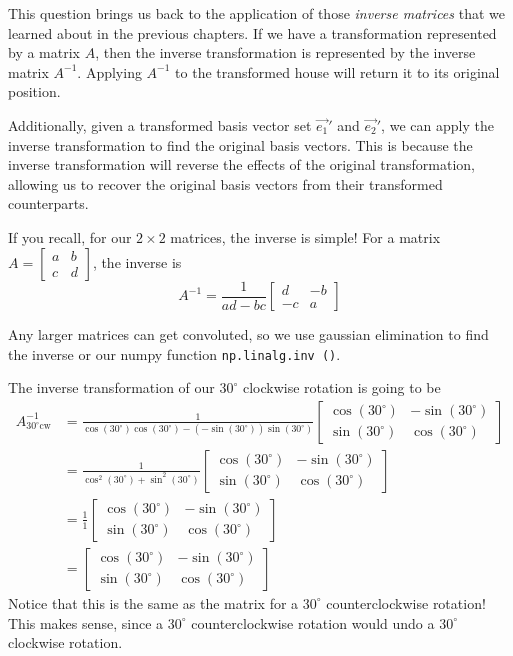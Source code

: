 This question brings us back to the application of those \textit{inverse matrices} that we learned about in the previous chapters. If we have a transformation represented by a matrix $A$, then the inverse transformation is represented by the inverse matrix $A^{-1}$. Applying $A^{-1}$ to the transformed house will return it to its original position.

Additionally, given a transformed basis vector set $\vec{ e_1}'$ and $\vec{ e_2}'$, we can apply the inverse transformation to find the original basis vectors. This is because the inverse transformation will reverse the effects of the original transformation, allowing us to recover the original basis vectors from their transformed counterparts.

If you recall, for our $2 \times 2$ matrices, the inverse is simple! For a matrix $A = \begin{bmatrix}
a & b \\
c & d
\end{bmatrix}$, the inverse is 
$$A^{-1} = \frac{1}{ad - bc}\begin{bmatrix}
d & -b \\
-c & a
\end{bmatrix}$$

Any larger matrices can get convoluted, so we use gaussian elimination to find the inverse or our numpy function \texttt{np.linalg.inv ()}.

The inverse transformation of our $30^\circ$ clockwise rotation is going to be 
\begin{align*}
A^{-1}_{30^\circ\textrm{cw}} &= \frac{1}{\cos(30^\circ)\cos(30^\circ) - (-\sin(30^\circ))\sin(30^\circ)}\begin{bmatrix}\cos(30^\circ) & -\sin(30^\circ) \\ \sin(30^\circ) & \cos(30^\circ) \end{bmatrix} \\
&= \frac{1}{\cos^2(30^\circ) + \sin^2(30^\circ)}\begin{bmatrix}\cos(30^\circ) & -\sin(30^\circ) \\ \sin(30^\circ) & \cos(30^\circ) \end{bmatrix} \\
&= \frac{1}{1}\begin{bmatrix}\cos(30^\circ) & -\sin(30^\circ) \\ \sin(30^\circ) & \cos(30^\circ) \end{bmatrix} \\
&= \begin{bmatrix}\cos(30^\circ) & -\sin(30^\circ) \\ \sin(30^\circ) & \cos(30^\circ) \end{bmatrix}
\end{align*}
Notice that this is the same as the matrix for a $30^\circ$ counterclockwise rotation! This makes sense, since a $30^\circ$ counterclockwise rotation would undo a $30^\circ$ clockwise rotation.

